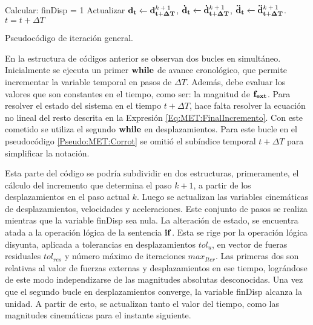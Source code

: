 \begin{algorithm}
\begin{algorithmic}
	\STATE Calcular: 
	\STATE finDisp = 1
	\ENDIF
	\ENDWHILE
	\STATE Actualizar $\bf{d_{t}}\xleftarrow[]{}\bf{d^\text{$k+1$}_{t+\Delta T}}$, $\bf{\dot{d}_{t}}\xleftarrow[]{}\bf{\dot{d}^\text{$k+1$}_{t+\Delta T}}$, $\bf{\ddot{d}_t}\xleftarrow[]{}\bf{\ddot{d}^\text{$k+1$}_{t+\Delta T}}$.
	\STATE $t = t+\Delta T$	
	\ENDWHILE
\end{algorithmic}
\caption{Pseudocódigo de iteración general. }
\label{Pseudo:MET:Corrot}
\end{algorithm}

En la estructura de códigos anterior se observan dos bucles en simultáneo. Inicialmente se ejecuta un primer $\bf{while}$ de avance cronológico, que permite incrementar la variable temporal en pasos de $\Delta T$. Además, debe evaluar los valores que son constantes en el tiempo, como ser: la magnitud de $\bf{f}_{ext}$. Para resolver el estado del sistema en el tiempo $t+\Delta T$, hace falta resolver la ecuación no lineal del resto descrita en la Expresión \eqref{Eq:MET:FinalIncremento}. Con este cometido se utiliza el segundo $\bf{while}$ en desplazamientos. Para este bucle en el pseudocódigo \ref{Pseudo:MET:Corrot} se omitió el subíndice temporal $t+\Delta T$ para simplificar la notación.

Esta parte del código se podría subdividir en dos estructuras, primeramente, el cálculo del incremento que determina el paso $k+1$, a partir de los desplazamientos en el paso actual $k$. Luego se actualizan las variables cinemáticas de desplazamientos, velocidades y aceleraciones. Este conjunto de pasos se realiza mientras que la variable finDisp sea nula. La alteración de estado, se encuentra atada a la operación lógica de la sentencia $\bf{if}$. Esta se rige por la operación lógica disyunta, aplicada a tolerancias en desplazamientos $tol_u$, en vector de fueras residuales $tol_{res}$ y número máximo de iteraciones $max_{Iter}$. Las primeras dos son relativas al valor de fuerzas externas y desplazamientos en ese tiempo, lográndose de este modo independizarse de las magnitudes absolutas desconocidas. Una vez que el segundo bucle en desplazamientos converge, la variable finDisp alcanza la unidad. A partir de esto, se actualizan tanto el valor del tiempo, como las magnitudes cinemáticas para el instante siguiente.

